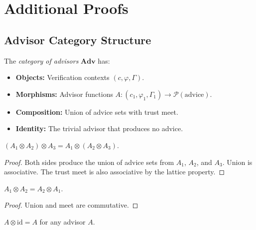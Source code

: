 \documentclass[11pt]{article}
\begin{document}
\appendix
\section{Additional Proofs}
\label{app:proofs}

\subsection{Advisor Category Structure}
\label{app:category}

\begin{definition}
\label{def:adv-cat}
The \emph{category of advisors} $\mathbf{Adv}$ has:
\begin{itemize}[leftmargin=2em]
\item \textbf{Objects:} Verification contexts $(c, \varphi, \Gamma)$.
\item \textbf{Morphisms:} Advisor functions $A : (c_1, \varphi_1, \Gamma_1) \to \mathcal{P}(\text{advice})$.
\item \textbf{Composition:} Union of advice sets with trust meet.
\item \textbf{Identity:} The trivial advisor that produces no advice.
\end{itemize}
\end{definition}

\begin{lemma}
\label{lem:adv-assoc}
$(A_1 \otimes A_2) \otimes A_3 = A_1 \otimes (A_2 \otimes A_3)$.
\end{lemma}

\begin{proof}
Both sides produce the union of advice sets from $A_1$, $A_2$,
and $A_3$.  Union is associative.  The trust meet is also
associative by the lattice property.
\end{proof}

\begin{lemma}
\label{lem:adv-comm}
$A_1 \otimes A_2 = A_2 \otimes A_1$.
\end{lemma}

\begin{proof}
Union and meet are commutative.
\end{proof}

\begin{lemma}
\label{lem:adv-id}
$A \otimes \mathrm{id} = A$ for any advisor $A$.
\end{lemma}
\end{document}
